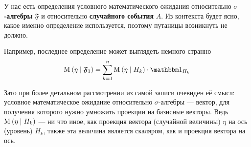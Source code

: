 \begin{remark}
    У нас есть определения условного математического ожидания
    относительно \textbf{$\sigma$-алгебры} $\mathfrak{F}$
    и относительно \textbf{случайного события} $A$.
    Из контекста будет ясно, какое именно определение используется,
    поэтому путаницы возникнуть не должно.

    Например, последнее определение может выглядеть немного странно
    $$\mean{\left( \eta \mid \mathfrak{F}_1 \right)}
        = \sum_{k=1}^n \mean{\left( \eta \mid H_k \right)}
            \cdot \indicatorof{H_k}$$

    Зато при более детальном рассмотрении из самой записи очевиден её смысл:
    условное математическое ожидание относительно $\sigma$-алгебры --- вектор,
    для получения которого нужно умножить проекции на базисные векторы.
    Ведь $\mathrm{M}_{} \left( \eta \mid H_k \right)$ --- ни что иное, как проекция
    вектора (случайной величины) $\eta$ на ось (уровень) $H_k$,
    также эта величина является скаляром, как и проекция вектора на ось.
\end{remark}

